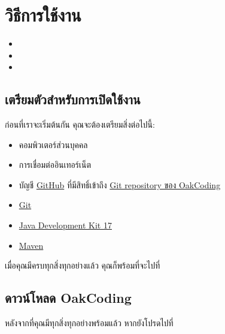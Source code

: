 \section{วิธีการใช้งาน}
\label{sec:usage}

\setlength{\baselineskip}{1ex}

\begin{itemize}[leftmargin=0pt]
    \item[] 
    \item[] 
    \item[] 
\end{itemize}

\rule{0em}{1ex}

\subsection{เตรียมตัวสำหรับการเปิดใช้งาน}
\label{subsec:prep-install}

ก่อนที่เราจะเริ่มต้นกัน คุณจะต้องเตรียมสิ่งต่อไปนี้:

\begin{itemize}
    \item คอมพิวเตอร์ส่วนบุคคล
    \item การเชื่อมต่ออินเทอร์เน็ต
    \item บัญชี \href{https://github.com/}{GitHub} ที่มีสิทธิ์เข้าถึง \href{https://github.com/CS211-651/project211-oakcoding.git}{Git repository ของ OakCoding}
    \item \href{https://git-scm.com/}{Git}
    \item \href{https://openjdk.org/}{Java Development Kit 17}
    \item \href{https://maven.apache.org/}{Maven}
\end{itemize}

เมื่อคุณมีครบทุกสิ่งทุกอย่างแล้ว คุณก็พร้อมที่จะไปที่ 

\clearpage

\subsection{ดาวน์โหลด OakCoding}
\label{subsec:install}

หลังจากที่คุณมีทุกสิ่งทุกอย่างพร้อมแล้ว หากยังโปรดไปที่\linebreak[3]\mbox{}\\

